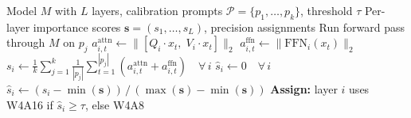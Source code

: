 \documentclass{article}
\begin{document}
\begin{algorithm}[t]
\caption{MCAP: Monte Carlo Activation Profiling}
\label{alg:mcap}
\begin{algorithmic}[1]
\REQUIRE Model $M$ with $L$ layers, calibration prompts $\mathcal{P} = \{p_1, \ldots, p_k\}$, threshold $\tau$
\ENSURE Per-layer importance scores $\mathbf{s} = (s_1, \ldots, s_L)$, precision assignments
  \STATE Run forward pass through $M$ on $p_j$
    \STATE $a_{i,t}^{\text{attn}} \leftarrow \| [Q_i \cdot x_t,\; V_i \cdot x_t] \|_2$
    \STATE $a_{i,t}^{\text{ffn}} \leftarrow \| \text{FFN}_i(x_t) \|_2$
  \ENDFOR
\ENDFOR
\STATE $s_i \leftarrow \frac{1}{k} \sum_{j=1}^{k} \frac{1}{|p_j|} \sum_{t=1}^{|p_j|}
  \left( a_{i,t}^{\text{attn}} + a_{i,t}^{\text{ffn}} \right) \quad \forall\, i$
  \STATE $\hat{s}_i \leftarrow 0 \quad \forall\, i$
\ELSE
  \STATE $\hat{s}_i \leftarrow (s_i - \min(\mathbf{s})) \,/\, (\max(\mathbf{s}) - \min(\mathbf{s}))$
\ENDIF
\STATE \textbf{Assign:} layer $i$ uses W4A16 if $\hat{s}_i \geq \tau$, else W4A8
\end{algorithmic}
\end{algorithm}
\end{document}
